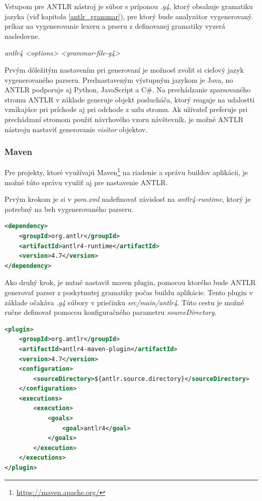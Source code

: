 Vstupom pre ANTLR nástroj je súbor s príponou \textit{.g4}, ktorý obsahuje gramatiku jazyka (viď kapitola \ref{antlr_grammar}), pre ktorý bude analyzátor vygenerovaný. príkaz na vygenerovanie lexeru a prseru z definovanej gramatiky vyzerá nasledovne.
\begin{center}
\textit{antlr4 <options> <grammar-file-g4>}
\end{center}

Prvým dôležitým nastavením pri generovaní je možnosť zvoliť si cieľový jazyk vygenerovaného parseru. Prednastaveným výstupným jazykom je Java, no ANTLR podporuje aj Python, JavaScript a C\#. Na prechádzanie zparsovaného stromu ANTLR v základe generuje objekt poslucháča, ktorý reaguje na udalostti vznikajúce pri príchode aj pri odchode z uzlu stromu. Ak užívateľ preferuje pri prechádzaní stromom použiť návrhového vzoru návštevník, je možné ANTLR nástroju nastaviť generovanie \textit{visitor} objektov.

\subsubsection{Maven}
Pre projekty, ktoré využívajú Maven\footnote{\url{https://maven.apache.org/}} na riadenie a správu buildov aplikácii, je možné túto správu využiť aj pre nastavenie ANTLR.

Prvým krokom je si v \textit{pom.xml} nadefinovať závislosť na \textit{antlr4-runtime}, ktorý je potrebný na beh vygenerovaného parseru.

\begin{lstlisting}[language=XML, frame=none, numbers=none]
<dependency>
    <groupId>org.antlr</groupId>
    <artifactId>antlr4-runtime</artifactId>
    <version>4.7</version>
</dependency>
\end{lstlisting}

Ako druhý krok, je nutné nastaviť maven plugin, pomocou ktorého bude ANTLR generovať parser z poskytnutej gramatiky počas buildu aplikácie. Tento plugin v základe očakáva \textit{.g4} súbory v priečinku \textit{src/main/antlr4}. Túto cestu je možné ručne definovať pomocou konfiguračného parametru \textit{sourceDirectory}.

\begin{minipage}{\linewidth}
\begin{lstlisting}[language=XML, frame=none, numbers=none]
<plugin>
    <groupId>org.antlr</groupId>
    <artifactId>antlr4-maven-plugin</artifactId>
    <version>4.7</version>
    <configuration>
        <sourceDirectory>${antlr.source.directory}</sourceDirectory>
    </configuration>
    <executions>
        <execution>
            <goals>
                <goal>antlr4</goal>
            </goals>
        </execution>
    </executions>
</plugin>
\end{lstlisting}
\end{minipage}

